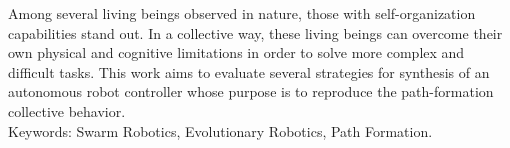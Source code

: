 Among several living beings observed in nature, those with self-organization capabilities stand out. In a collective way, these living beings can overcome their own physical and cognitive limitations in order to solve more complex and difficult tasks. This work aims to evaluate several strategies for synthesis of an autonomous robot controller whose purpose is to reproduce the path-formation collective behavior.\\

\noindent
Keywords: Swarm Robotics, Evolutionary Robotics, Path Formation.